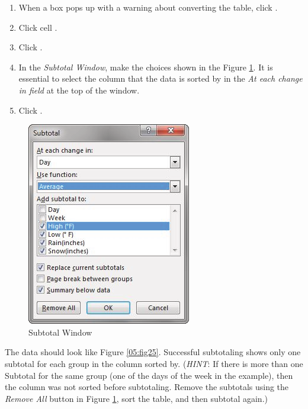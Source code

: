 \begin{enumbox}
\begin{enumerate}
		\item When a box pops up with a warning about converting the table, click .
		\item Click cell .
		\item Click .
		\item In the \textit{Subtotal Window}, make the choices shown in the Figure \ref{05:fig24}. It is essential to select the column that the data is sorted by in the \textit{At each change in field} at the top of the window. 
		\item Click .
	\end{enumerate}
\end{enumbox}
	
\begin{figure}[H]
	\centering
	\includegraphics[width=\maxwidth{.95\linewidth}]{gfx/ch05_fig24}
	\caption{Subtotal Window}
	\label{05:fig24}
\end{figure}

The data should look like Figure \ref{05:fig25}. Successful subtotaling shows only one subtotal for each group in the column sorted by. (\textit{HINT}: If there is more than one Subtotal for the same group (\ie one of the days of the week in the example), then the column was not sorted before subtotaling. Remove the subtotals using the \textit{Remove All} button in Figure \ref{05:fig24}, sort the table, and then subtotal again.)

